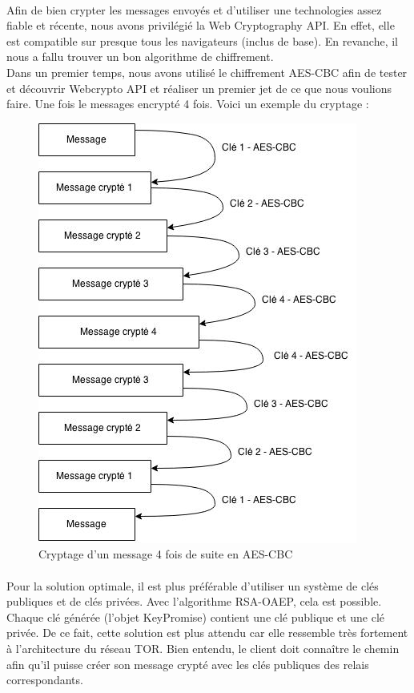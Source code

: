 \documentclass[a4paper,12pt]{report}
\begin{document}
	\paragraph*{}
	Afin de bien crypter les messages envoyés et d'utiliser une technologies assez fiable et récente, nous avons privilégié la Web Cryptography API. En effet, elle est compatible sur presque tous les navigateurs (inclus de base). En revanche, il nous a fallu trouver un bon algorithme de chiffrement.\\
	Dans un premier temps, nous avons utilisé le chiffrement AES-CBC afin de tester et découvrir Webcrypto API et réaliser un premier jet de ce que nous voulions faire. Une fois le messages encrypté 4 fois. Voici un exemple du cryptage :
	\newpage	
	\begin{figure}[h] %
		\includegraphics[scale=0.70]{AES.jpg}
		\caption{Cryptage d'un message 4 fois de suite en AES-CBC}
		\label{AES}
	\end{figure}
	\paragraph*{}
	Pour la solution optimale, il est plus préférable d'utiliser un système de clés publiques et de clés privées. Avec l'algorithme RSA-OAEP, cela est possible. Chaque clé générée (l'objet KeyPromise) contient une clé publique et une clé privée. De ce fait, cette solution est plus attendu car elle ressemble très fortement à l'architecture du réseau TOR. Bien entendu, le client doit connaître le chemin afin qu'il puisse créer son message crypté avec les clés publiques des relais correspondants.
\end{document}
